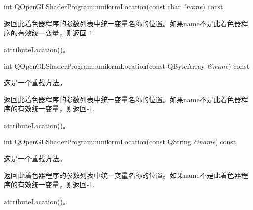 int QOpenGLShaderProgram::uniformLocation(const char \emph{*name}) const

返回此着色器程序的参数列表中统一变量名称的位置。如果name不是此着色器程序的有效统一变量，则返回-1.

\begin{seeAlso}
attributeLocation()。
\end{seeAlso}

int QOpenGLShaderProgram::uniformLocation(const QByteArray \emph{\&name}) const

这是一个重载方法。

返回此着色器程序的参数列表中统一变量名称的位置。如果name不是此着色器程序的有效统一变量，则返回-1.

\begin{seeAlso}
attributeLocation()。
\end{seeAlso}

int QOpenGLShaderProgram::uniformLocation(const QString \emph{\&name}) const

这是一个重载方法。

返回此着色器程序的参数列表中统一变量名称的位置。如果name不是此着色器程序的有效统一变量，则返回-1.

\begin{seeAlso}
attributeLocation()。
\end{seeAlso}